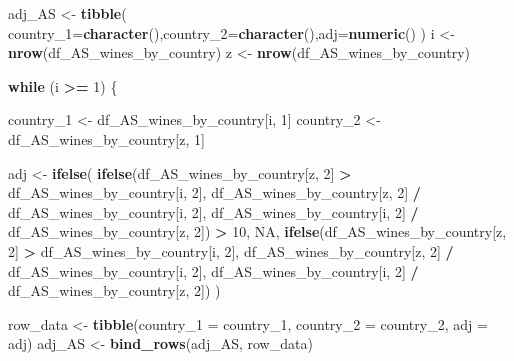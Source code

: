\documentclass[
]{article}
\newenvironment{Shaded}{\begin{snugshade}}{\end{snugshade}}
\newcommand{\AttributeTok}[1]{\textcolor[rgb]{0.13,0.29,0.53}{#1}}
\newcommand{\ConstantTok}[1]{\textcolor[rgb]{0.56,0.35,0.01}{#1}}
\newcommand{\ControlFlowTok}[1]{\textcolor[rgb]{0.13,0.29,0.53}{\textbf{#1}}}
\newcommand{\DecValTok}[1]{\textcolor[rgb]{0.00,0.00,0.81}{#1}}
\newcommand{\FunctionTok}[1]{\textcolor[rgb]{0.13,0.29,0.53}{\textbf{#1}}}
\newcommand{\NormalTok}[1]{#1}
\newcommand{\OtherTok}[1]{\textcolor[rgb]{0.56,0.35,0.01}{#1}}
\newcommand{\SpecialCharTok}[1]{\textcolor[rgb]{0.81,0.36,0.00}{\textbf{#1}}}
\begin{document}
\begin{Shaded}
\begin{Highlighting}[]
\NormalTok{adj\_AS }\OtherTok{\textless{}{-}} \FunctionTok{tibble}\NormalTok{( }\AttributeTok{country\_1=}\FunctionTok{character}\NormalTok{(),}\AttributeTok{country\_2=}\FunctionTok{character}\NormalTok{(),}\AttributeTok{adj=}\FunctionTok{numeric}\NormalTok{()}
\NormalTok{)}
\NormalTok{i }\OtherTok{\textless{}{-}} \FunctionTok{nrow}\NormalTok{(df\_AS\_wines\_by\_country)}
\NormalTok{z }\OtherTok{\textless{}{-}} \FunctionTok{nrow}\NormalTok{(df\_AS\_wines\_by\_country)}


\ControlFlowTok{while}\NormalTok{ (i }\SpecialCharTok{\textgreater{}=} \DecValTok{1}\NormalTok{) \{  }

\NormalTok{  country\_1 }\OtherTok{\textless{}{-}}\NormalTok{ df\_AS\_wines\_by\_country[i, }\DecValTok{1}\NormalTok{]}
\NormalTok{  country\_2 }\OtherTok{\textless{}{-}}\NormalTok{ df\_AS\_wines\_by\_country[z, }\DecValTok{1}\NormalTok{]}

\NormalTok{  adj }\OtherTok{\textless{}{-}} \FunctionTok{ifelse}\NormalTok{(}
    \FunctionTok{ifelse}\NormalTok{(df\_AS\_wines\_by\_country[z, }\DecValTok{2}\NormalTok{] }\SpecialCharTok{\textgreater{}}\NormalTok{ df\_AS\_wines\_by\_country[i, }\DecValTok{2}\NormalTok{],}
\NormalTok{           df\_AS\_wines\_by\_country[z, }\DecValTok{2}\NormalTok{] }\SpecialCharTok{/}\NormalTok{ df\_AS\_wines\_by\_country[i, }\DecValTok{2}\NormalTok{],}
\NormalTok{           df\_AS\_wines\_by\_country[i, }\DecValTok{2}\NormalTok{] }\SpecialCharTok{/}\NormalTok{ df\_AS\_wines\_by\_country[z, }\DecValTok{2}\NormalTok{]) }\SpecialCharTok{\textgreater{}} \DecValTok{10}\NormalTok{,}
    \ConstantTok{NA}\NormalTok{,}
    \FunctionTok{ifelse}\NormalTok{(df\_AS\_wines\_by\_country[z, }\DecValTok{2}\NormalTok{] }\SpecialCharTok{\textgreater{}}\NormalTok{ df\_AS\_wines\_by\_country[i, }\DecValTok{2}\NormalTok{],}
\NormalTok{           df\_AS\_wines\_by\_country[z, }\DecValTok{2}\NormalTok{] }\SpecialCharTok{/}\NormalTok{ df\_AS\_wines\_by\_country[i, }\DecValTok{2}\NormalTok{],}
\NormalTok{           df\_AS\_wines\_by\_country[i, }\DecValTok{2}\NormalTok{] }\SpecialCharTok{/}\NormalTok{ df\_AS\_wines\_by\_country[z, }\DecValTok{2}\NormalTok{])}
\NormalTok{  )}

  
\NormalTok{  row\_data }\OtherTok{\textless{}{-}} \FunctionTok{tibble}\NormalTok{(}\AttributeTok{country\_1 =}\NormalTok{ country\_1, }\AttributeTok{country\_2 =}\NormalTok{ country\_2, }\AttributeTok{adj =}\NormalTok{ adj)}
\NormalTok{  adj\_AS }\OtherTok{\textless{}{-}} \FunctionTok{bind\_rows}\NormalTok{(adj\_AS, row\_data)}


\end{Highlighting}
\end{Shaded}
\end{document}
